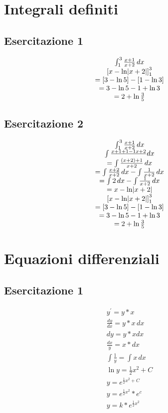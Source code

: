 \section{Integrali definiti}
\subsection{Esercitazione 1}
	\begin{equation}
		\begin{matrix}
			\int_{1}^{3} \frac{x+1}{x+2}\,dx\\
			\left[x-\ln\lvert x+2\rvert\right]_{1}^{3}\\
			=[3-\ln 5]-[1-\ln 3]\\
			=3-\ln 5-1+\ln 3\\
			=2+\ln\frac{3}{5}
		\end{matrix}
	\end{equation}
\subsection{Esercitazione 2}
	\begin{equation}
		\begin{matrix}
			\int_{1}^{3} \frac{x+1}{x+2}\,dx\\
			\int \frac{x+1+1-1{x+2}}\,dx\\
			=\int \frac{(x+2)+1}{x+2}\,dx\\
			=\int \frac{x+2}{x+2}\,dx-\int \frac{1}{x+2}\,dx\\
			=\int 2\,dx-\int\frac{1}{x+2}\,dx\\
			=x-\ln\lvert x+2\rvert\\
			\left[x-\ln\lvert x+2\rvert\right]_{1}^{3}\\
			=[3-\ln 5]-[1-\ln 3]\\
			=3-\ln 5-1+\ln 3\\
			=2+\ln\frac{3}{5}
		\end{matrix}
	\end{equation}
\section{Equazioni differenziali}
\subsection{Esercitazione 1}
	\begin{equation}
		\begin{matrix}
			y^\prime=y*x\\
			\frac{dy}{dx}=y*x\,dx\\
			dy=y*xdx\\
			\frac{dx}{y}=x*dx\\
			\int\frac{1}{y}=\int x\,dx\\
			\ln y=\frac{1}{2}x^2+C\\
			y=e^{\frac{1}{2}x^2+C}\\
			y=e^{\frac{1}{2}x^2}*e^c\\
			y=k*e^{\frac{1}{2}x^2}
		\end{matrix}
	\end{equation}

